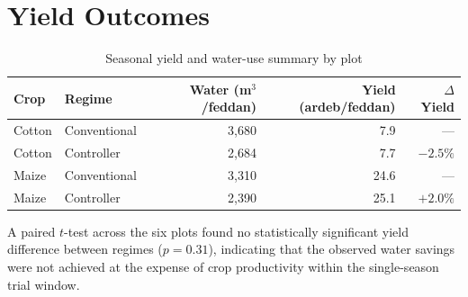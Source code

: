\section{Yield Outcomes}
\begin{table}[H]
\centering
\caption{Seasonal yield and water-use summary by plot}
\label{tab:results}
\begin{tabularx}{\textwidth}{@{}lXrrr@{}}
\toprule
\rowcolor{cairoblue!10}
\textbf{Crop} & \textbf{Regime} & \textbf{Water (m$^3$/feddan)} & \textbf{Yield (ardeb/feddan)} & \textbf{$\Delta$ Yield} \\
\midrule
Cotton & Conventional & 3{,}680 & 7.9 & --- \\
Cotton & Controller   & 2{,}684 & 7.7 & $-2.5\%$ \\
\addlinespace
Maize  & Conventional & 3{,}310 & 24.6 & --- \\
Maize  & Controller   & 2{,}390 & 25.1 & $+2.0\%$ \\
\bottomrule
\end{tabularx}
\end{table}

A paired $t$-test across the six plots found no statistically significant yield difference
between regimes ($p = 0.31$), indicating that the observed water savings were not achieved at
the expense of crop productivity within the single-season trial window.
